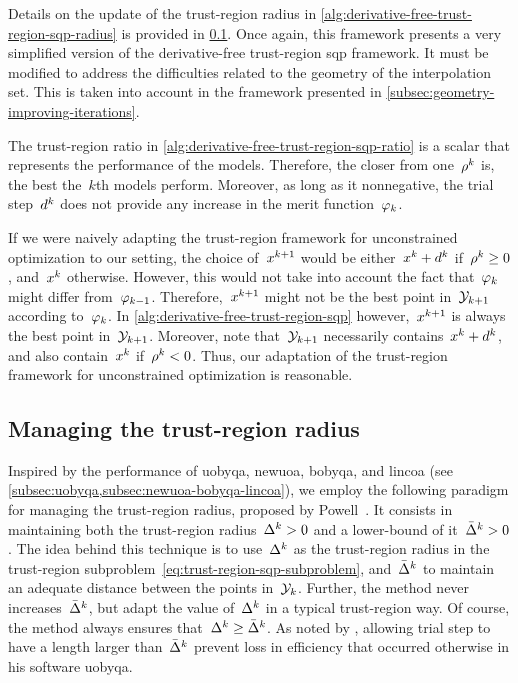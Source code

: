 Details on the update of the trust-region radius in \cref{alg:derivative-free-trust-region-sqp-radius} is provided in \cref{subsec:trust-region-radius}.
Once again, this framework presents a very simplified version of the derivative-free trust-region \gls{sqp} framework.
It must be modified to address the difficulties related to the geometry of the interpolation set.
This is taken into account in the framework presented in \cref{subsec:geometry-improving-iterations}.

The trust-region ratio in \cref{alg:derivative-free-trust-region-sqp-ratio} is a scalar that represents the performance of the models.
Therefore, the closer from one~$\ratio[k]$ is, the best the~$k$th models perform.
Moreover, as long as it nonnegative, the trial step~$\step[k]$ does not provide any increase in the merit function~$\merit[k]$.

If we were naively adapting the trust-region framework for unconstrained optimization to our setting, the choice of~$\iter[k + 1]$ would be either~$\iter[k] + \step[k]$ if~$\ratio[k] \ge 0$, and~$\iter[k]$ otherwise.
However, this would not take into account the fact that~$\merit[k]$ might differ from~$\merit[k - 1]$.
Therefore,~$\iter[k + 1]$ might not be the best point in~$\xpt[k + 1]$ according to~$\merit[k]$.
In \cref{alg:derivative-free-trust-region-sqp} however,~$\iter[k + 1]$ is always the best point in~$\xpt[k + 1]$.
Moreover, note that~$\xpt[k + 1]$ necessarily contains~$\iter[k] + \step[k]$, and also contain~$\iter[k]$ if~$\ratio[k] < 0$.
Thus, our adaptation of the trust-region framework for unconstrained optimization is reasonable.

\subsection{Managing the trust-region radius}
\label{subsec:trust-region-radius}

Inspired by the performance of \gls{uobyqa}, \gls{newuoa}, \gls{bobyqa}, and \gls{lincoa} (see \cref{subsec:uobyqa,subsec:newuoa-bobyqa-lincoa}), we employ the following paradigm for managing the trust-region radius, proposed by Powell~\cite{Powell_2002,Powell_2006,Powell_2009}.
It consists in maintaining both the trust-region radius~$\rad[k] > 0$ and a lower-bound of it~$\radlb[k] > 0$.
The idea behind this technique is to use~$\rad[k]$ as the trust-region radius in the trust-region subproblem~\cref{eq:trust-region-sqp-subproblem}, and~$\radlb[k]$ to maintain an adequate distance between the points in~$\xpt[k]$.
Further, the method never increases~$\radlb[k]$, but adapt the value of~$\rad[k]$ in a typical trust-region way.
Of course, the method always ensures that~$\rad[k] \ge \radlb[k]$.
As noted by \citeauthor{Powell_2002}, allowing trial step to have a length larger than~$\radlb[k]$ prevent loss in efficiency that occurred otherwise in his software \gls{uobyqa}.

